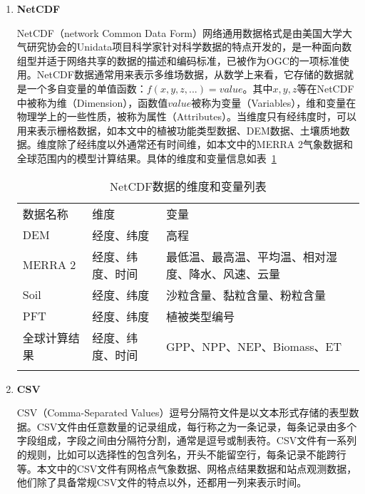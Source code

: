 \begin{enumerate}[(1)]
    \item \textbf{NetCDF}
    
    NetCDF（network Common Data Form）网络通用数据格式是由美国大学大气研究协会的Unidata项目科学家针对科学数据的特点开发的，是一种面向数组型并适于网络共享的数据的描述和编码标准，已被作为OGC的一项标准使用。NetCDF数据通常用来表示多维场数据，从数学上来看，它存储的数据就是一个多自变量的单值函数：$f(x,y,z,...)=value$。其中$x,y,z$等在NetCDF中被称为维（Dimension），函数值$value$被称为变量（Variables），维和变量在物理学上的一些性质，被称为属性（Attributes）。当维度只有经纬度时，可以用来表示栅格数据，如本文中的植被功能类型数据、DEM数据、土壤质地数据。维度除了经纬度以外通常还有时间维，如本文中的MERRA 2气象数据和全球范围内的模型计算结果。具体的维度和变量信息如表~\ref{tab:nc-dim-var} %

    \begin{table}[H]
        \centering
        \caption{NetCDF数据的维度和变量列表}
        \label{tab:nc-dim-var}
        \begin{threeparttable}
            \begin{tabular}{lll}
                \Xhline{1.5pt}
                数据名称 & 维度 & 变量 \\
                \Xhline{1.5pt}
                DEM & 经度、纬度 & 高程 \\
                \hline
                MERRA 2 & 经度、纬度、时间 & \multicolumn{1}{m{0.4\columnwidth}}{最低温、最高温、平均温、相对湿度、降水、风速、云量} \\
                \hline
                Soil & 经度、纬度 & \multicolumn{1}{m{0.4\columnwidth}}{沙粒含量、黏粒含量、粉粒含量} \\
                \hline
                PFT & 经度、纬度 & 植被类型编号 \\
                \hline
                全球计算结果 & 经度、纬度、时间 & \multicolumn{1}{m{0.4\columnwidth}}{GPP、NPP、NEP、Biomass、ET} \\
                \Xhline{1.5pt}
            \end{tabular}
        \end{threeparttable}
    \end{table}

    \item \textbf{CSV}
    
    CSV（Comma-Separated Values）逗号分隔符文件是以文本形式存储的表型数据。CSV文件由任意数量的记录组成，每行称之为一条记录，每条记录由多个字段组成，字段之间由分隔符分割，通常是逗号或制表符。CSV文件有一系列的规则，比如可以选择性的包含列名，开头不能留空行，每条记录不能跨行等。本文中的CSV文件有网格点气象数据、网格点结果数据和站点观测数据，他们除了具备常规CSV文件的特点以外，还都用一列来表示时间。


\end{enumerate}
